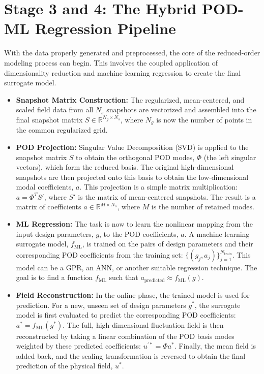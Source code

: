 \documentclass[dsc, EN]{ufabcFHZh}
\begin{document}
{\section{Stage 3 and 4: The Hybrid POD-ML Regression Pipeline}

With the data properly generated and preprocessed, the core of the reduced-order modeling process can begin. This involves the coupled application of dimensionality reduction and machine learning regression to create the final surrogate model.

\begin{itemize}
    \item \textbf{Snapshot Matrix Construction:} The regularized, mean-centered, and scaled field data from all $N_s$ snapshots are vectorized and assembled into the final snapshot matrix $S \in \mathbb{R}^{N_g \times N_s}$, where $N_g$ is now the number of points in the common regularized grid.

    \item \textbf{POD Projection:} Singular Value Decomposition (SVD) is applied to the snapshot matrix $S$ to obtain the orthogonal POD modes, $\Phi$ (the left singular vectors), which form the reduced basis. The original high-dimensional snapshots are then projected onto this basis to obtain the low-dimensional modal coefficients, $a$. This projection is a simple matrix multiplication: $a = \Phi^T S'$, where $S'$ is the matrix of mean-centered snapshots. The result is a matrix of coefficients $a \in \mathbb{R}^{M \times N_s}$, where $M$ is the number of retained modes.

    \item \textbf{ML Regression:} The task is now to learn the nonlinear mapping from the input design parameters, $g$, to the POD coefficients, $a$. A machine learning surrogate model, $f_{\text{ML}}$, is trained on the pairs of design parameters and their corresponding POD coefficients from the training set: $\{(g_j, a_j)\}_{j=1}^{N_{\text{train}}}$. This model can be a GPR, an ANN, or another suitable regression technique. The goal is to find a function $f_{\text{ML}}$ such that $a_{\text{predicted}} \approx f_{\text{ML}}(g)$.

    \item \textbf{Field Reconstruction:} In the online phase, the trained model is used for prediction. For a new, unseen set of design parameters $g^*$, the surrogate model is first evaluated to predict the corresponding POD coefficients: $a^{*} = f_{\text{ML}}(g^{*})$. The full, high-dimensional fluctuation field is then reconstructed by taking a linear combination of the POD basis modes weighted by these predicted coefficients: $u^{\prime *} = \Phi a^{*}$. Finally, the mean field is added back, and the scaling transformation is reversed to obtain the final prediction of the physical field, $u^{*}$.
\end{itemize}

}
\end{document}
